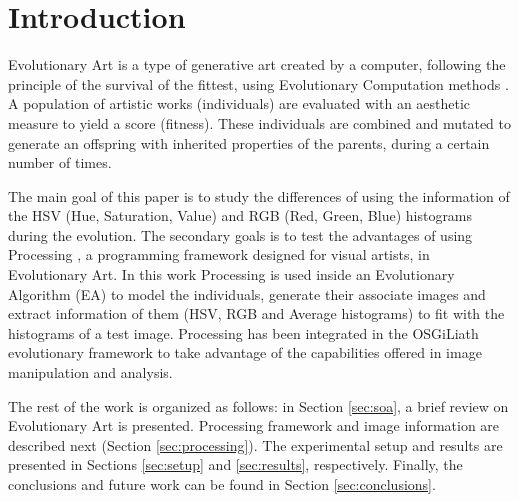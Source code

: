 \documentclass[conference]{IEEEtran}
\begin{document}
\section{Introduction}\label{intro}
Evolutionary Art \cite{EART} is a type of generative art \cite{PHEROGRAPHY} created by a
computer, following the principle of the survival of the fittest, %
using Evolutionary Computation methods \cite{INTROEIBEN}. A population
of artistic works (individuals) are evaluated with an aesthetic
measure to yield a score (fitness). These individuals are combined and
mutated to generate an offspring with inherited properties of the
parents, during a certain number of times. 

The main goal of this paper is to study the differences of using
the information of the HSV (Hue, Saturation, Value) and RGB (Red,
Green, Blue) histograms during the evolution.
The secondary goals is to test the advantages of using
Processing \cite{PROCESSING}, a programming framework designed for visual artists, in
Evolutionary Art. 
 In this work Processing is used inside an Evolutionary Algorithm (EA) to model the
individuals, generate their associate images and extract information
of them (HSV, RGB and Average histograms) to fit with the histograms
of a test image. Processing has been integrated in the OSGiLiath \cite{OSGILIATH} 
evolutionary framework to take advantage of the capabilities offered in image manipulation and analysis.



The rest of the work is organized as follows: in Section \ref{sec:soa}, a brief review on Evolutionary Art is presented. Processing framework and image information are described next (Section \ref{sec:processing}). The experimental setup and results are presented in Sections \ref{sec:setup} and \ref{sec:results}, respectively. Finally, the conclusions and future work can be found in Section \ref{sec:conclusions}.
\end{document}
